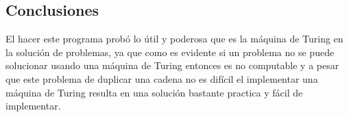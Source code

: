\subsection{Conclusiones}
El hacer este programa probó lo útil y poderosa que es la máquina de Turing en la solución de problemas, ya que como es evidente si un problema no se puede solucionar usando una máquina de Turing entonces es no computable y a pesar que este problema de duplicar una cadena no es difícil el implementar una máquina de Turing resulta en una solución bastante practica y fácil de implementar.
